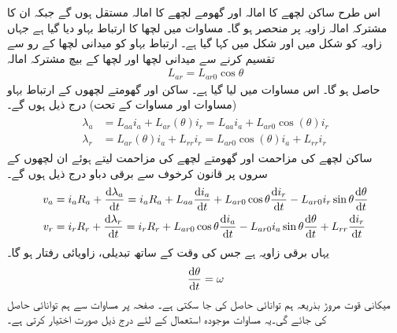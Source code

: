 اس طرح ساکن لچھے کا امالہ  اور گھومے لچھے کا امالہ  مستقل ہوں گے جبکہ ان کا مشترکہ امالہ  زاویہ  پر منحصر ہو گا۔ مساوات  میں لچھا  کا  ارتباط بہاو  دیا گیا ہے  جہاں  زاویہ  کو شکل  میں  اور شکل   میں  کہا گیا ہے۔ ارتباط بہاو   کو میدانی لچھا کے رو  سے تقسیم کرنے سے میدانی لچھا اور لچھا  کے بیچ مشترکہ امالہ 
\begin{align}
L_{ar}=L_{ar0} \cos \theta
\end{align}
حاصل ہو گا۔ اس مساوات میں  لیا گیا ہے۔
ساکن اور گھومتے لچھوں کے ارتباط بہاو  (مساوات  اور مساوات
  کے تحت) درج ذیل ہوں گے۔
\begin{gather}
\begin{aligned}
\lambda_a&=L_{aa} i_a+L_{ar}(\theta) i_r=L_{aa} i_a+L_{ar0} \cos (\theta) i_r\\
\lambda_r&=L_{ar}(\theta) i_a+L_{rr} i_r=L_{ar0} \cos (\theta) i_a+L_{rr} i_r
\end{aligned}
\end{gather}
ساکن لچھے کی مزاحمت  اور گھومتے لچھے کی مزاحمت  لیتے ہوئے ان لچھوں کے سروں پر  قانون کرخوف سے برقی دباو درج ذیل ہوں گے۔
\begin{gather}
\begin{aligned}
v_a&=i_a R_a +\frac{\dif \lambda_a}{\dif t}=i_a R_a+L_{aa} \frac{\dif i_a}{\dif t}+L_{ar0} \cos \theta \frac{\dif i_r}{\dif t}-L_{ar0}  i_r \sin \theta  \frac{\dif \theta}{\dif t}\\
v_r&=i_r R_r +\frac{\dif \lambda_r}{\dif t}=i_r R_r+L_{ar0} \cos \theta \frac{\dif i_a}{\dif t}-L_{ar0} i_a \sin \theta  \frac{\dif \theta}{\dif t}+L_{rr} \frac{\dif i_r}{\dif t}
\end{aligned}
\end{gather}
یہاں  برقی زاویہ ہے جس کی وقت کے ساتھ  تبدیلی، زاویائی رفتار   ہو گا۔
\begin{align}
\frac{\dif \theta}{\dif t}=\omega
\end{align}
میکانی قوت مروڑ بذریعہ ہم توانائی حاصل کی جا سکتی ہے۔ صفحہ  پر مساوات   سے  ہم توانائی  حاصل  کی جائے  گی۔یہ مساوات موجودہ استعمال کے لئے درج ذیل صورت اختیار کرتی ہے۔
